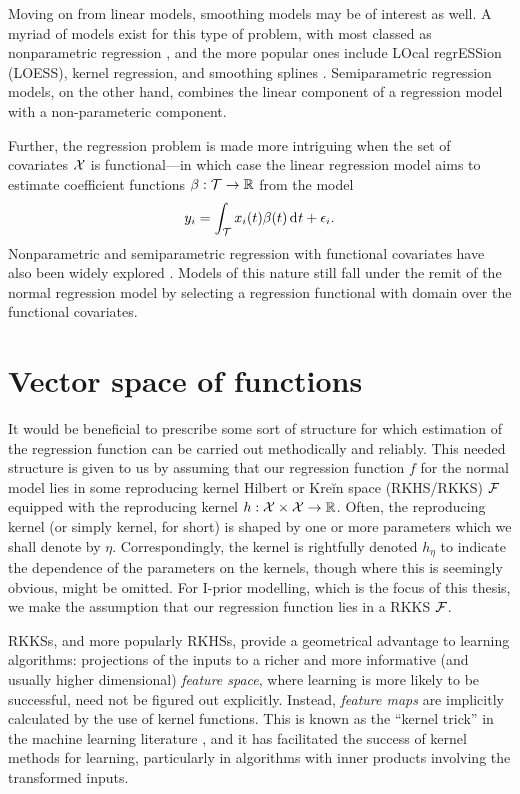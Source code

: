 \documentclass[11pt,twoside,openright,showframe]{report}
\begin{document}
Moving on from linear models, smoothing models may be of interest as well.
A myriad of models exist for this type of problem, with most classed as nonparametric regression \citep{wassermann2006all}, and the more popular ones include LOcal regrESSion (LOESS), kernel regression, and smoothing splines \citep{wahba1990spline}.
Semiparametric regression models, on the other hand, combines the linear component of a regression model with a non-parameteric component.

Further, the regression problem is made more intriguing when the set of covariates ${\mathcal X}$ is functional---in which case the linear regression model aims to estimate coefficient functions $\beta:{\mathcal T} \to \mathbb{R}$ from the model
\[
  y_i = \int_{\mathcal T} x_i(t)\beta(t) \operatorname{d}\hspace{0.5pt}\! t + \epsilon_i.
\]
Nonparametric and semiparametric regression with functional covariates have also been widely explored \citep{ramsay2005functional}.
Models of this nature still fall under the remit of the normal regression model by selecting a regression functional with domain over the functional covariates.

\section{Vector space of functions}

It would be beneficial to prescribe some sort of structure for which estimation of the regression function can be carried out methodically and reliably. 
This needed structure is given to us by assuming that our regression function $f$ for the normal model lies in some reproducing kernel Hilbert or Kreĭn space (RKHS/RKKS) ${\mathcal F}$ equipped with the reproducing kernel $h:{\mathcal X} \times {\mathcal X} \to \mathbb{R}$.
Often, the reproducing kernel (or simply kernel, for short) is shaped by one or more parameters which we shall denote by $\eta$.
Correspondingly, the kernel is rightfully denoted $h_\eta$ to indicate the dependence of the parameters on the kernels, though where this is seemingly obvious, might be omitted.
For I-prior modelling, which is the focus of this thesis, we make the assumption that our regression function lies in a RKKS ${\mathcal F}$.

RKKSs, and more popularly RKHSs, provide a geometrical advantage to learning algorithms: projections of the inputs to a richer and more informative (and usually higher dimensional) \emph{feature space}, where learning is more likely to be successful, need not be figured out explicitly.
Instead, \emph{feature maps} are implicitly calculated by the use of kernel functions. 
This is known as the ``kernel trick'' in the machine learning literature \citep{hofmann2008kernel}, and it has facilitated the success of kernel methods for learning, particularly in algorithms with inner products involving the transformed inputs. 
\end{document}
